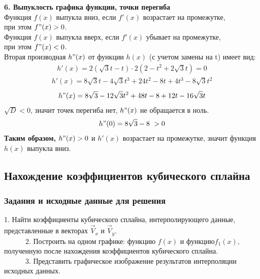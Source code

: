 \documentclass[russian,utf8,nocolumnxxxi,nocolumnxxxii]{eskdtext}
\begin{document}
      \textbf{6. Выпуклость графика функции, точки перегиба}\\
     Функция ${f(x)}$ выпукла вниз, если ${f'(x)}$ возрастает на промежутке, \\
     при этом  ${f"(x)}>0$.\\
      Функция ${f(x)}$ выпукла вверх, если ${f'(x)}$ убывает на промежутке, \\
      при этом  ${f"(x)}<0$.\\[10pt]
     Вторая производная ${h"(x)}$ от функции ${h(x)}$ (с учетом замены на {t}) имеет вид:\\
     \begin{equation}\label{eq:num24}
     \begin{align}
     h'(x)=2(\sqrt{3}t-t)\cdot2(2-t^2+2\sqrt{3}t)=0
     \end{align}
     \end{equation}
      \begin{equation}\label{eq:num25}
      \begin{align}
      h'(x)=8\sqrt{3}t-4\sqrt{3}t^3+24t^2-8t+4t^3-8\sqrt{3}t^2
      \end{align}
      \end{equation}
       \begin{equation}\label{eq:num26}
       \begin{align}
       h"(x)=8\sqrt{3}-12\sqrt{3}t^2+48t-8+12t-16\sqrt{3}t
       \end{align}
       \end{equation}
       $\sqrt{D}<0$, значит точек перегиба нет, $h"(x)$ не обращается в ноль.
       \begin{equation}\label{eq:num27}
       \begin{align}
       h"(0)=8\sqrt{3}-8\,\,>0
       \end{align}
       \end{equation}
       \textbf{Таким образом,} $h"(x)>0$ и ${h'(x)}$ возрастает на промежутке, значит
       функция ${h(x)}$ выпукла вниз.
       
      \newpage
      \subsection{Нахождение коэффициентов кубического сплайна}
     \upshape
      \subsubsection{Задания и исходные данные для решения} 
      $ $1. Найти коэффициенты кубического сплайна, интерполирующего данные, представленные в векторах$\,\,  {\vec{V}_x} \,\,$и$\,\, {\vec{V}_y.}$ \\
      $ {\,\,\,\,\,\,\,\,\,\,\,\,\,\,\,\,\,\,}$2. Построить на одном графике: функцию$\,\, {f(x)}\,\, $и$\,\,  функцию {f_1(x)}, $полученную после нахождения коэффициентов кубического сплайна.$ $ \\
      $ {\,\,\,\,\,\,\,\,\,\,\,\,\,\,\,\,\,\,}$3. Представить графическое изображение результатов интерполяции исходных данных$ $.\\
                       
\end{document}
